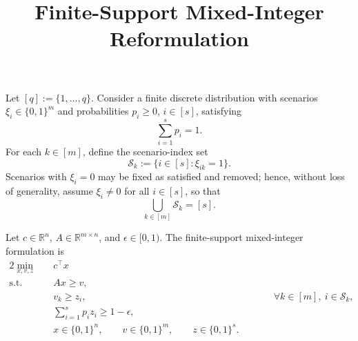 \documentclass[11pt,a4paper]{article}
\title{Finite-Support Mixed-Integer Reformulation}
\author{}
\date{}
\begin{document}
\maketitle

Let $[q]:=\{1,\ldots,q\}$. Consider a finite discrete distribution with scenarios $\xi_i\in\{0,1\}^m$ and probabilities $p_i\geq 0$, $i\in[s]$, satisfying
\[
\sum_{i=1}^{s}p_i=1.
\]
For each $k\in[m]$, define the scenario-index set
\[
\mathcal{S}_k:=\{i\in[s]:\xi_{ik}=1\}.
\]
Scenarios with $\xi_i=0$ may be fixed as satisfied and removed; hence, without loss of generality, assume $\xi_i\neq 0$ for all $i\in[s]$, so that
\[
\bigcup_{k\in[m]}\mathcal{S}_k=[s].
\]

Let $c\in\mathbb{R}^n$, $A\in\mathbb{R}^{m\times n}$, and $\epsilon\in[0,1)$. The finite-support mixed-integer formulation is
\begin{alignat}{2}
\min_{x,v,z}\quad & c^{\top}x \\
\text{s.t.}\quad
& Ax\geq v, \tag{1}\\
& v_k\geq z_i, &&\qquad \forall k\in[m],\ i\in\mathcal{S}_k, \tag{2}\\
& \sum_{i=1}^{s}p_i z_i\geq 1-\epsilon, \tag{3}\\
& x\in\{0,1\}^n,\qquad v\in\{0,1\}^m,\qquad z\in\{0,1\}^s. \tag{4}
\end{alignat}
\end{document}
